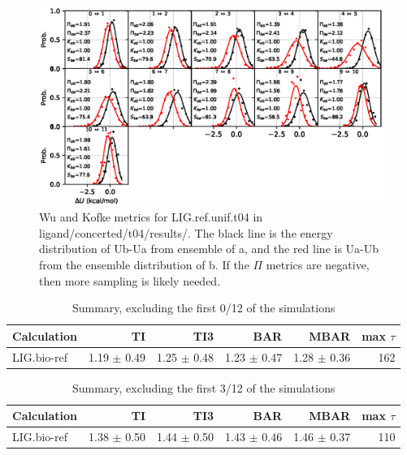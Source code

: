\documentclass[journal=jctcce,manuscript=article,hyperref=false]{achemso}
\begin{document}
\begin{figure}
\includegraphics[clip,width=6in]{ligand.concerted.t04.results..hist.eps}\vspace{-0.3cm}
                        \caption{Wu and Kofke metrics for LIG.ref.unif.t04 in ligand/concerted/t04/results/. The black line is the energy distribution of Ub-Ua from ensemble of a, and the red line is Ua-Ub from the ensemble distribution of b. If the $\Pi$ metrics are negative, then more sampling is likely needed.}
\end{figure}


\clearpage
\pagebreak

\begin{table}
\caption{Summary, excluding the first 0/12 of the simulations}
{\small
\begin{tabular}{l r r r r r}
\hline
                             Calculation &                 TI &                TI3 &                BAR &               MBAR & max $\tau$\\
\hline                             LIG.bio-ref &    1.19 $\pm$    0.49 &    1.25 $\pm$    0.48 &    1.23 $\pm$    0.47 &    1.28 $\pm$    0.36 &     162 \\

\hline
\end{tabular}
}
\end{table}

\begin{table}
\caption{Summary, excluding the first 3/12 of the simulations}
{\small
\begin{tabular}{l r r r r r}
\hline
                             Calculation &                 TI &                TI3 &                BAR &               MBAR & max $\tau$\\
\hline                             LIG.bio-ref &    1.38 $\pm$    0.50 &    1.44 $\pm$    0.50 &    1.43 $\pm$    0.46 &    1.46 $\pm$    0.37 &     110 \\

\hline
\end{tabular}
}
\end{table}
\end{document}
